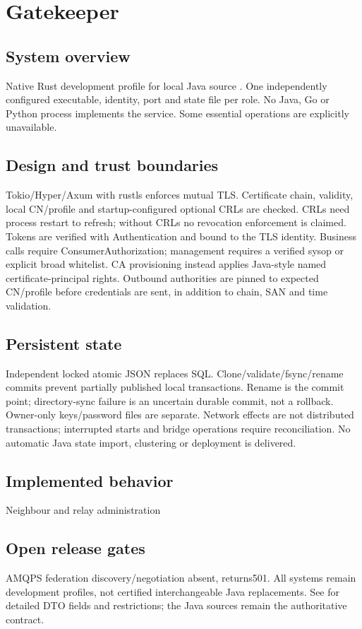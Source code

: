 \documentclass[a4paper]{arrowhead}
\begin{document}
\section{Gatekeeper}
\subsection{System overview}
Native Rust development profile for local Java source . One independently configured executable, identity, port and state file per role. No Java, Go or Python process implements the service. Some essential operations are explicitly unavailable.
\subsection{Design and trust boundaries}
Tokio/Hyper/Axum with rustls enforces mutual TLS. Certificate chain, validity, local CN/profile and startup-configured optional CRLs are checked. CRLs need process restart to refresh; without CRLs no revocation enforcement is claimed. Tokens are verified with Authentication and bound to the TLS identity. Business calls require ConsumerAuthorization; management requires a verified sysop or explicit broad whitelist. CA provisioning instead applies Java-style named certificate-principal rights. Outbound authorities are pinned to expected CN/profile before credentials are sent, in addition to chain, SAN and time validation.
\subsection{Persistent state}
Independent locked atomic JSON replaces SQL. Clone/validate/fsync/rename commits prevent partially published local transactions. Rename is the commit point; directory-sync failure is an uncertain durable commit, not a rollback. Owner-only keys/password files are separate. Network effects are not distributed transactions; interrupted starts and bridge operations require reconciliation. No automatic Java state import, clustering or deployment is delivered.
\subsection{Implemented behavior}
Neighbour and relay administration
\subsection{Open release gates}
AMQPS federation discovery/negotiation absent, returns501. All systems remain development profiles, not certified interchangeable Java replacements. See  for detailed DTO fields and restrictions; the Java sources remain the authoritative contract.
\end{document}

